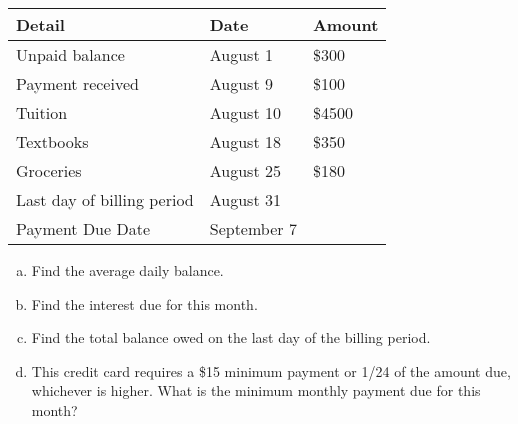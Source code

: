\begin{exercises}
{\begin{tabular}{l l l}
Detail & Date & Amount\\
\hline
Unpaid balance & August 1 & \$300\\
Payment received & August 9 & \$100\\
Tuition & August 10 & \$4500\\
Textbooks & August 18 & \$350\\
Groceries & August 25 & \$180\\
Last day of billing period & August 31 &\\
Payment Due Date & September 7 &\\
\end{tabular}

\begin{enumerate}[(a)]
\item Find the average daily balance.
\item Find the interest due for this month.
\item Find the total balance owed on the last day of the billing period.
\item This credit card requires a \$15 minimum payment or 1/24 of the amount due, whichever is higher.  What is the minimum monthly payment due for this month?
\end{enumerate}}
\vfill
\pagebreak

\end{exercises}
